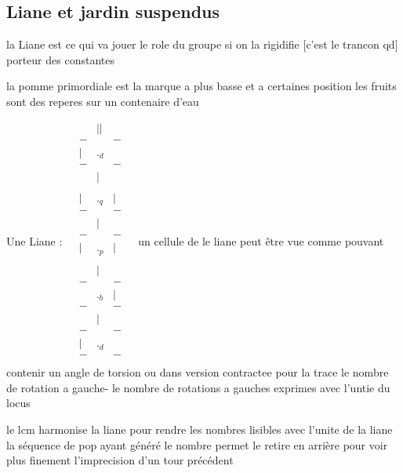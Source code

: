 \documentclass{article}
\begin{document}
 \subsection{  Liane et jardin suspendus }

 la Liane est ce qui va jouer le role du groupe si on la rigidifie [c'est le trancon qd] porteur des constantes
  
  la pomme primordiale est la marque a plus basse et a certaines position les fruits sont des reperes sur un contenaire d'eau 
%  



  Une Liane :
  $\begin{matrix}
  & &||& &\\
  &-&&-&\\
  &|&._d&&\\
  &-&&-&\\
  &&|&&\\
  &&&&\\
  &|&._q&|&\\
  &-&&-&\\
  &&|&&\\
&-&&-&\\
 &|&._p&|&\\
  &&&&\\
  &&|&&\\
  &-&&-&\\
    &&._b&|&\\
  &-&&-&\\
  &&|&&\\
  &-&&-&\\
  &|&._d&&\\
  &-&&-&\\
  \end{matrix}
  $  
  un cellule de le liane peut être vue comme pouvant contenir un angle de torsion ou dans version contractee pour la trace le nombre de rotation a gauche- le nombre de rotations a gauches exprimes avec l'untie du locus
  
  le lcm harmonise la liane  pour rendre les nombres lisibles avec l'unite de la liane 
  la séquence de pop ayant généré le nombre permet le retire en arrière pour voir plus finement l'imprecision d'un tour précédent
  
\end{document}
